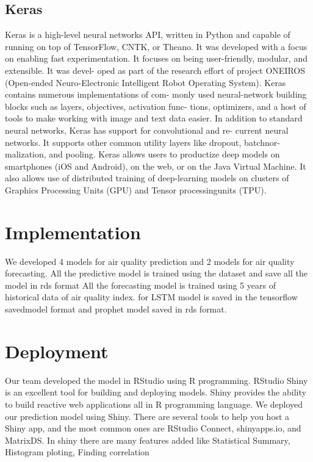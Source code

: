 \subsection{Keras}

Keras is a high-level neural networks API, written in Python and capable of running on
top of TensorFlow, CNTK, or Theano. It was developed with a focus on enabling fast
experimentation. It focuses on being user-friendly, modular, and extensible. It was devel-
oped as part of the research effort of project ONEIROS (Open-ended Neuro-Electronic
Intelligent Robot Operating System). Keras contains numerous implementations of com-
monly used neural-network building blocks such as layers, objectives, activation func-
tions, optimizers, and a host of tools to make working with image and text data easier.
In addition to standard neural networks, Keras has support for convolutional and re-
current neural networks. It supports other common utility layers like dropout, batchnor-
malization, and pooling.
Keras allows users to productize deep models on smartphones (iOS and Android),
on the web, or on the Java Virtual Machine. It also allows use of distributed training
of deep-learning models on clusters of Graphics Processing Units (GPU) and Tensor
processingunits (TPU).

\section{Implementation}
We developed  4 models for air quality prediction and 2 models for air quality forecasting.
All the predictive model is trained using the dataset and save all the model in rds format 
All the forecasting model is trained using 5 years of historical data of air quality index.
for LSTM model is saved in the tensorflow savedmodel format
and prophet model saved in rds format.
\section{Deployment}
   Our team developed the model in RStudio using R programming. RStudio Shiny is an excellent tool for building and deploying models. Shiny provides the ability to build reactive web applications all in R programming language. 
    We deployed our prediction model using Shiny. There are several tools to help you host a Shiny app, and the most common ones are RStudio Connect, shinyapps.io, and MatrixDS.
In shiny there are many features added like Statistical Summary, Histogram ploting, Finding correlation

